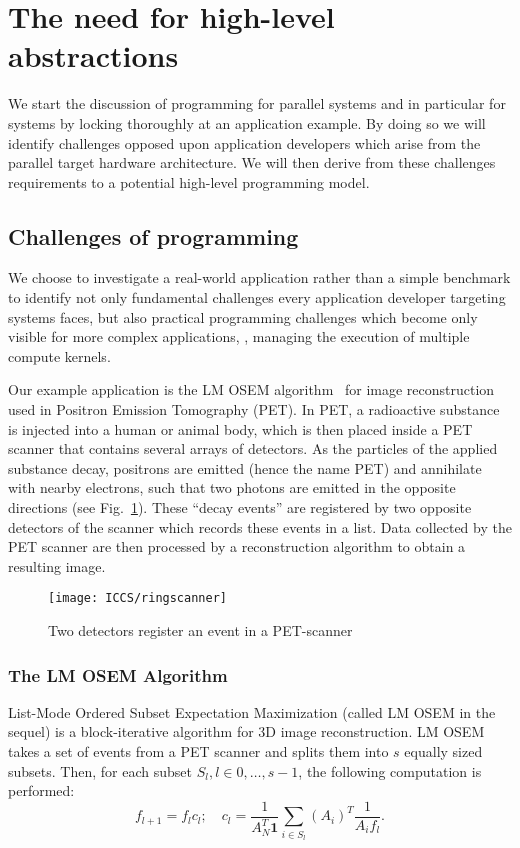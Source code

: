 \section{The need for high-level abstractions}
We start the discussion of programming for parallel systems and in particular for \GPU systems by locking thoroughly at an application example.
By doing so we will identify challenges opposed upon application developers which arise from the parallel target hardware architecture.
We will then derive from these challenges requirements to a potential high-level programming model.


\subsection{Challenges of \GPU programming}
\label{section:opencl-example}
We choose to investigate a real-world application rather than a simple benchmark to identify not only fundamental challenges every application developer targeting \GPU systems faces, but also practical programming challenges which become only visible for more complex applications, \eg, managing the execution of multiple compute kernels.

Our example application is the LM OSEM algorithm~\cite{ReaderErFlOt1998, SchellmannGoMeKoScWuBu2009} for image reconstruction used in Positron Emission Tomography (PET).
In PET, a radioactive substance is injected into a human or animal body, which is then placed inside a PET scanner that contains several arrays of detectors.
As the particles of the applied substance decay, positrons are emitted (hence the name PET) and annihilate with nearby electrons, such that two photons are emitted in the opposite directions (see Fig.~\ref{fig:scanner and detector}).
These ``decay events'' are registered by two opposite detectors of the scanner which records these events in a list.
Data collected by the PET scanner are then processed by a reconstruction algorithm to obtain a resulting image.

\begin{figure}
  \centering
  \texttt{[image: ICCS/ringscanner]}
  \caption{Two detectors register an event in a PET-scanner}
  \label{fig:scanner and detector}
\end{figure}

\subsubsection{The LM OSEM Algorithm}
List-Mode Ordered Subset Expectation Maximization \cite{ReaderErFlOt1998} (called LM OSEM in the sequel) is a block-iterative algorithm for 3D image reconstruction.
LM OSEM takes a set of events from a PET scanner and splits them into $s$ equally sized subsets.
Then, for each subset $S_l, l \in {0, \ldots, s-1}$, the following computation is performed:
\begin{equation}
  f_{l+1}=f_{l}c_{l};\quad c_{l}=\dfrac{1}{A_N^T \textbf{1}} \sum_{i \in S_{l}} (A_i)^T \dfrac{1}{A_{i} f_{l}}.
\label{equ:lm_osem}
\end{equation}

